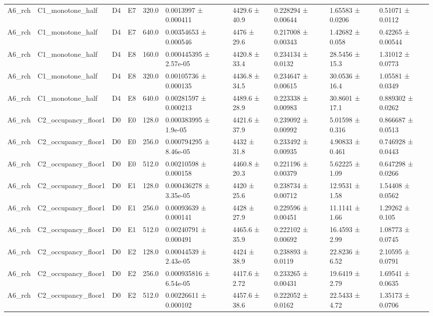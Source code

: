 \begin{table}
\begin{tabular}{llllllllll}
A6\_rch & C1\_monotone\_half & D4 & E7 & 320.0 & 0.0013997 ± 0.000411 & 4429.6 ± 40.9 & 0.228294 ± 0.00644 & 1.65583 ± 0.0206 & 0.51071 ± 0.0112 \\
A6\_rch & C1\_monotone\_half & D4 & E7 & 640.0 & 0.00354653 ± 0.000546 & 4476 ± 29.6 & 0.217008 ± 0.00343 & 1.42682 ± 0.058 & 0.42265 ± 0.00544 \\
A6\_rch & C1\_monotone\_half & D4 & E8 & 160.0 & 0.000445395 ± 2.57e-05 & 4420.8 ± 33.4 & 0.234134 ± 0.0132 & 28.5456 ± 15.3 & 1.31012 ± 0.0773 \\
A6\_rch & C1\_monotone\_half & D4 & E8 & 320.0 & 0.00105736 ± 0.000135 & 4436.8 ± 34.5 & 0.234647 ± 0.00615 & 30.0536 ± 16.4 & 1.05581 ± 0.0349 \\
A6\_rch & C1\_monotone\_half & D4 & E8 & 640.0 & 0.00281597 ± 0.000213 & 4489.6 ± 28.9 & 0.223338 ± 0.00983 & 30.8601 ± 17.1 & 0.889302 ± 0.0262 \\
A6\_rch & C2\_occupancy\_floor1 & D0 & E0 & 128.0 & 0.000383995 ± 1.9e-05 & 4421.6 ± 37.9 & 0.239092 ± 0.00992 & 5.01598 ± 0.316 & 0.866687 ± 0.0513 \\
A6\_rch & C2\_occupancy\_floor1 & D0 & E0 & 256.0 & 0.000794295 ± 8.46e-05 & 4432 ± 31.8 & 0.233492 ± 0.00935 & 4.90833 ± 0.461 & 0.746928 ± 0.0443 \\
A6\_rch & C2\_occupancy\_floor1 & D0 & E0 & 512.0 & 0.00210598 ± 0.000158 & 4460.8 ± 20.3 & 0.221196 ± 0.00379 & 5.62225 ± 1.09 & 0.647298 ± 0.0266 \\
A6\_rch & C2\_occupancy\_floor1 & D0 & E1 & 128.0 & 0.000436278 ± 3.35e-05 & 4420 ± 25.6 & 0.238734 ± 0.00712 & 12.9531 ± 1.58 & 1.54408 ± 0.0562 \\
A6\_rch & C2\_occupancy\_floor1 & D0 & E1 & 256.0 & 0.00093639 ± 0.000141 & 4428 ± 27.9 & 0.229596 ± 0.00451 & 11.1141 ± 1.66 & 1.29262 ± 0.105 \\
A6\_rch & C2\_occupancy\_floor1 & D0 & E1 & 512.0 & 0.00240791 ± 0.000491 & 4465.6 ± 35.9 & 0.222102 ± 0.00692 & 16.4593 ± 2.99 & 1.08773 ± 0.0745 \\
A6\_rch & C2\_occupancy\_floor1 & D0 & E2 & 128.0 & 0.00044539 ± 2.43e-05 & 4424 ± 38.9 & 0.238893 ± 0.0119 & 22.8236 ± 6.52 & 2.10595 ± 0.0791 \\
A6\_rch & C2\_occupancy\_floor1 & D0 & E2 & 256.0 & 0.000935816 ± 6.54e-05 & 4417.6 ± 2.72 & 0.233265 ± 0.00431 & 19.6419 ± 2.79 & 1.69541 ± 0.0635 \\
A6\_rch & C2\_occupancy\_floor1 & D0 & E2 & 512.0 & 0.00226611 ± 0.000102 & 4457.6 ± 38.6 & 0.222052 ± 0.0162 & 22.5433 ± 4.72 & 1.35173 ± 0.0706 \\

\end{tabular}
\end{table}
